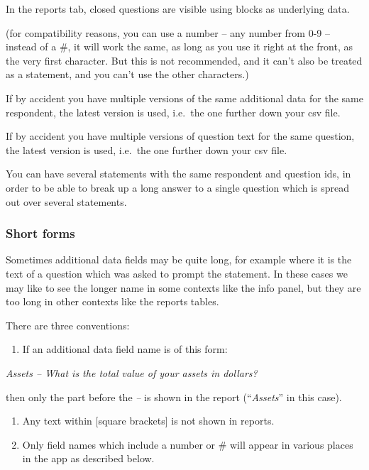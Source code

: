 \documentclass[
]{book}
\providecommand{\tightlist}{%
  \setlength{\itemsep}{0pt}\setlength{\parskip}{0pt}}
\begin{document}
In the reports tab, closed questions are visible using blocks as underlying data.

(for compatibility reasons, you can use a number -- any number from 0-9 -- instead of a \#, it will work the same, as long as you use it right at the front, as the very first character. But this is not recommended, and it can't also be treated as a statement, and you can't use the other characters.)

If by accident you have multiple versions of the same additional data for the same respondent, the latest version is used, i.e.~the one further down your csv file.

If by accident you have multiple versions of question text for the same question, the latest version is used, i.e.~the one further down your csv file.

You can have several statements with the same respondent and question ids, in order to be able to break up a long answer to a single question which is spread out over several statements.

\hypertarget{short-forms}{%
\subsubsection{Short forms}\label{short-forms}}

Sometimes additional data fields may be quite long, for example where it is the text of a question which was asked to prompt the statement. In these cases we may like to see the longer name in some contexts like the info panel, but they are too long in other contexts like the reports tables.

There are three conventions:

\begin{enumerate}
\def\labelenumi{\arabic{enumi})}
\tightlist
\item
  If an additional data field name is of this form:
\end{enumerate}

\emph{Assets -- What is the total value of your assets in dollars?}

then only the part before the \emph{--} is shown in the report (``\emph{Assets}'' in this case).

\begin{enumerate}
\def\labelenumi{\arabic{enumi})}
\setcounter{enumi}{1}
\item
  Any text within {[}square brackets{]} is not shown in reports.
\item
  Only field names which include a number or \# will appear in various places in the app as described below.
\end{enumerate}
\end{document}
